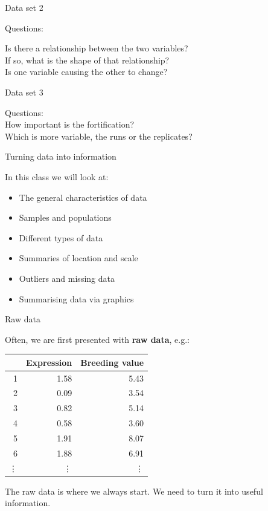 \documentclass[12pt,xcolor=dvipsnames,handout,mathserif,aspectratio=169]{beamer}
\newcommand{\bre}[1]{{\color{red} \textbf{#1}}}
\begin{document}
\begin{frame}{Data set 2}

Questions:\\ 
\vspace{0.5cm}

Is there a relationship between the two variables?\\
\vspace{0.5cm}
If so, what is the shape of that relationship?\\
\vspace{0.5cm}
Is one variable causing the other to change?\\
\end{frame}

\begin{frame}{Data set 3}

Questions:\\ 
\vspace{0.5cm}
How important is the fortification?\\
\vspace{0.5cm}
Which is more variable, the runs or the replicates?

\end{frame}

\begin{frame}{ Turning data into information }

In this class we will look at:
\begin{itemize}
\item The general characteristics of data
\item Samples and populations
\item Different types of data
\item Summaries of location and scale
\item Outliers and missing data
\item Summarising data via graphics
\end{itemize}

\end{frame}

\begin{frame}{ Raw data }

Often, we are first presented with \bre{raw data}, e.g.:
\begin{table}[ht]
\centering
\begin{tabular}{rrr}
  \hline
 & Expression & Breeding value \\ 
  \hline
1 & 1.58 & 5.43 \\ 
  2 & 0.09 & 3.54 \\ 
  3 & 0.82 & 5.14 \\ 
  4 & 0.58 & 3.60 \\ 
  5 & 1.91 & 8.07 \\ 
  6 & 1.88 & 6.91 \\ 
  \vdots & \vdots & \vdots \\ 
   \hline
\end{tabular}
\end{table}\pause
The raw data is where we always start. We need to turn it into useful information.\\
\pause
\vspace{0.2cm}

\end{frame}
\end{document}
